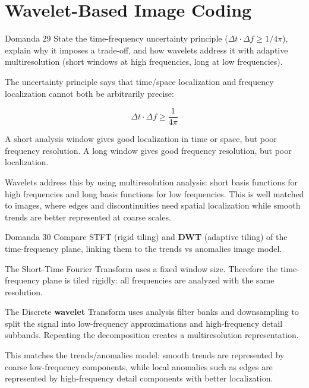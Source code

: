 \section{Wavelet-Based Image Coding}




\begin{questionbox}{Domanda 29}
State the time-frequency uncertainty principle ($\Delta t \cdot \Delta f \geq 1/4\pi$), explain why it imposes a trade-off, and how wavelets address it with adaptive multiresolution (short windows at high frequencies, long at low frequencies).
\end{questionbox}


The uncertainty principle says that time/space localization and frequency localization cannot both be arbitrarily precise:


$$
\Delta t \cdot \Delta f \geq \frac{1}{4\pi}
$$


A short analysis window gives good localization in time or space, but poor frequency resolution. A long window gives good frequency resolution, but poor localization.

Wavelets address this by using multiresolution analysis: short basis functions for high frequencies and long basis functions for low frequencies. This is well matched to images, where edges and discontinuities need spatial localization while smooth trends are better represented at coarse scales.



\begin{questionbox}{Domanda 30}
Compare STFT (rigid tiling) and \textbf{DWT} (adaptive tiling) of the time-frequency plane, linking them to the trends vs anomalies image model.
\end{questionbox}


The Short-Time Fourier Transform uses a fixed window size. Therefore the time-frequency plane is tiled rigidly: all frequencies are analyzed with the same resolution.

The Discrete \textbf{wavelet} Transform uses analysis filter banks and downsampling to split the signal into low-frequency approximations and high-frequency detail subbands. Repeating the decomposition creates a multiresolution representation.

This matches the trends/anomalies model: smooth trends are represented by coarse low-frequency components, while local anomalies such as edges are represented by high-frequency detail components with better localization.



